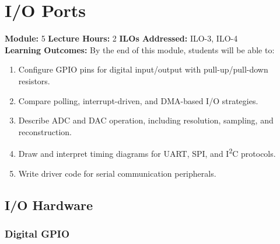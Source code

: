 
\chapter{I/O Ports}
\label{ch:io}

\begin{moduleinfo}
  \textbf{Module:} 5 \quad
  \textbf{Lecture Hours:} 2 \quad
  \textbf{ILOs Addressed:} ILO-3, ILO-4 \\[4pt]
  \textbf{Learning Outcomes:} By the end of this module, students will be able to:
  \begin{enumerate}[nosep]
    \item Configure GPIO pins for digital input/output with pull-up/pull-down resistors.
    \item Compare polling, interrupt-driven, and DMA-based I/O strategies.
    \item Describe ADC and DAC operation, including resolution, sampling, and reconstruction.
    \item Draw and interpret timing diagrams for UART, SPI, and I\textsuperscript{2}C protocols.
    \item Write driver code for serial communication peripherals.
  \end{enumerate}
\end{moduleinfo}

\section{I/O Hardware}
\label{sec:io:hw}

\subsection{Digital GPIO}

